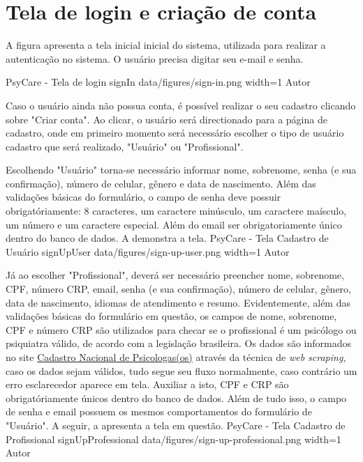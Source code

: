 \section{Tela de login e criação de conta}
\label{sec:loginCriacao}

A figura  apresenta a tela inicial inicial do sistema, utilizada para realizar a autenticação no sistema. O usuário precisa digitar seu e-mail e senha.

\image
    {PsyCare - Tela de login}
    {signIn}
    {data/figures/sign-in.png}
    {width=1\textwidth}
    {Autor}

Caso o usuário ainda não possua conta, é possível realizar o seu cadastro clicando sobre "Criar conta". Ao clicar, o usuário será directionado para a página de cadastro, onde em primeiro momento será necessário escolher o tipo de usuário cadastro que será realizado, "Usuário" ou "Profissional". 

Escolhendo "Usuário" torna-se necessário informar nome, sobrenome, senha (e sua confirmação), número de celular, gênero e data de nascimento. Além das validações básicas do formulário, o campo de senha deve possuir obrigatóriamente: 8 caracteres, um caractere minúsculo, um caractere maísculo, um número e um caractere especial. Além do email ser obrigatoriamente único dentro do banco de dados. A  demonstra a tela.
\image
    {PsyCare - Tela Cadastro de Usuário}
    {signUpUser}
    {data/figures/sign-up-user.png}
    {width=1\textwidth}
    {Autor}

Já ao escolher "Profissional", deverá ser necessário preencher nome, sobrenome, CPF, número CRP, email, senha (e sua confirmação), número de celular, gênero, data de nascimento, idiomas de atendimento e resumo. Evidentemente, além das validações básicas do formulário em questão, os campos de nome, sobrenome, CPF e número CRP são utilizados para checar se o profissional é um psicólogo ou psiquiatra válido, de acordo com a legislação brasileira. Os dados são informados no site \href{https://cadastro.cfp.org.br/}{Cadastro Nacional de Psicologas(os)} através da técnica de \textit{web scraping}, caso os dados sejam válidos, tudo segue seu fluxo normalmente, caso contrário um erro esclarecedor aparece em tela. Auxiliar a isto, CPF e CRP são obrigatóriamente únicos dentro do banco de dados. Além de tudo isso, o campo de senha e email possuem os mesmos comportamentos do formulário de "Usuário". A seguir, a  apresenta a tela em questão.
\image
    {PsyCare - Tela Cadastro de Profissional}
    {signUpProfessional}
    {data/figures/sign-up-professional.png}
    {width=1\textwidth}
    {Autor}